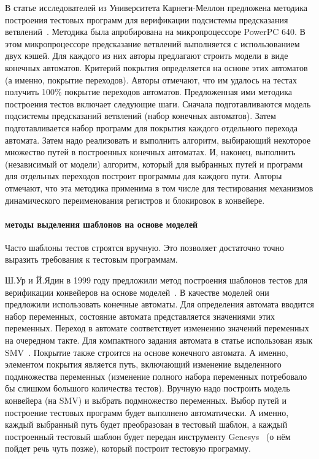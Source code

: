 \documentclass[14pt]{extreport}
\begin{document}
В статье исследователей из Университета Карнеги-Меллон предложена методика построения тестовых программ для верификации подсистемы предсказания ветвлений~\cite{Branches99}. Методика была апробирована на микропроцессоре PowerPC 640. В этом микропроцессоре предсказание ветвлений выполняется с использованием двух кэшей. Для каждого из них авторы предлагают строить модели в виде конечных автоматов. Критерий покрытия определяется на основе этих автоматов (а именно, покрытие переходов). Авторы отмечают, что им удалось на тестах получить 100\% покрытие переходов автоматов. Предложенная ими методика построения тестов включает следующие шаги. Сначала подготавливаются модель подсистемы предсказаний ветвлений (набор конечных автоматов). Затем подготавливается набор программ для покрытия каждого отдельного перехода автомата. Затем надо реализовать и выполнить алгоритм, выбирающий некоторое множество путей в построенных конечных автоматах. И, наконец, выполнить (независимый от модели) алгоритм, который для выбранных путей и программ для отдельных переходов построит программы для каждого пути. Авторы отмечают, что эта методика применима в том числе для тестирования механизмов динамического переименования регистров и блокировок в конвейере.

\paragraph{методы выделения шаблонов на основе моделей}

Часто шаблоны тестов строятся вручную. Это позволяет достаточно точно выразить требования к тестовым программам.

Ш.Ур и Й.Ядин в 1999 году предложили метод построения шаблонов тестов для верификации конвейеров на основе моделей~\cite{UrFSM}. В качестве моделей они предложили использовать конечные автоматы. Для определения автомата вводится набор переменных, состояние автомата представляется значениями этих переменных. Переход в автомате соответствует изменению значений переменных на очередном такте. Для компактного задания автомата в статье использован язык SMV~\cite{SMV}. Покрытие также строится на основе конечного автомата. А именно, элементом покрытия является путь, включающий изменение выделенного подмножества переменных (изменение полного набора переменных потребовало бы слишком большого количества тестов). Вручную надо построить модель конвейера (на SMV) и выбрать подмножество переменных. Выбор путей и построение тестовых программ будет выполнено автоматически. А именно, каждый выбранный путь будет преобразован в тестовый шаблон, а каждый построенный тестовый шаблон будет передан инструменту Genesys~\cite{Genesys} (о нём пойдет речь чуть позже), который построит тестовую программу.
\end{document}
